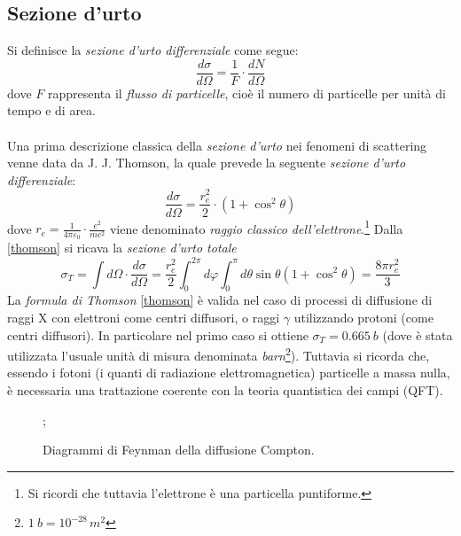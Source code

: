 \documentclass[a4paper, 12pt, oneside]{article}
\begin{document}
\subsection{Sezione d'urto}
Si definisce la \emph{sezione d'urto differenziale} come segue:
\begin{displaymath}
\frac{d\sigma}{d\Omega}=\frac{1}{F}\cdot\frac{dN}{d\Omega}
\end{displaymath}
dove $F$ rappresenta il \emph{flusso di particelle}, cioè il numero di particelle per unità di tempo e di area.\\\\
Una prima descrizione classica della \emph{sezione d'urto} nei fenomeni di scattering venne data da J. J. Thomson, la quale prevede la seguente \emph{sezione d'urto differenziale}:
\begin{equation}\label{thomson}
\frac{d\sigma}{d\Omega}=\frac{r_e^2}{2}\cdot(1+\cos^2\theta)
\end{equation}
dove $r_e=\frac{1}{4\pi\varepsilon_0}\cdot\frac{e^2}{mc^2}$ viene denominato \emph{raggio classico dell'elettrone}.\footnote{Si ricordi che tuttavia l'elettrone è una particella puntiforme.} Dalla \eqref{thomson} si ricava la \emph{sezione d'urto totale}
\begin{displaymath}
\sigma_T=\int d\Omega\cdot \frac{d\sigma}{d\Omega}=\frac{r_e^2}{2}\int_0^{2\pi}d\varphi\int_0^\pi d\theta\sin\theta(1+\cos^2\theta)=\frac{8\pi r{_e^2}}{3}
\end{displaymath}
La \emph{formula di Thomson} \eqref{thomson} è valida nel caso di processi di diffusione di raggi X con elettroni come centri diffusori, o raggi $\gamma$ utilizzando protoni (come centri diffusori). In particolare nel primo caso si ottiene $\sigma_T=\SI{0.665}{b}$ (dove è stata utilizzata l'usuale unità di misura denominata \emph{barn}\footnote{$\SI{1}{b}=10^{-28}\,\si{m^2}$}). Tuttavia si ricorda che, essendo i fotoni (i quanti di radiazione elettromagnetica) particelle a massa nulla, è necessaria una trattazione coerente con la teoria quantistica dei campi (QFT).
\begin{figure}[!h]
\centering
{}\qquad\qquad
{};
\caption{Diagrammi di Feynman della diffusione Compton.}\label{fey}
\end{figure}
\end{document}

